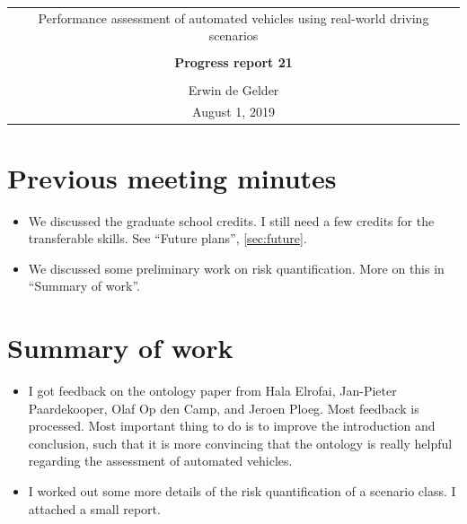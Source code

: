 \documentclass[10pt,final,a4paper,oneside,onecolumn]{article}
\newcommand{\progressreportnumber}{21}
\renewcommand{\author}{Erwin de Gelder}
\renewcommand{\date}{August 1, 2019}
\renewcommand{\title}{Performance assessment of automated vehicles using real-world driving scenarios}
\begin{document}
	
\begin{center}
	\begin{tabular}{c}
		\title \\ \\
		\textbf{\huge Progress report \progressreportnumber} \\ \\
		\author \\ 
		\date
	\end{tabular}
\end{center}

\section{Previous meeting minutes}

\begin{itemize}
	\item We discussed the graduate school credits. I still need a few credits for the transferable skills. See ``Future plans'', \cref{sec:future}.
	\item We discussed some preliminary work on risk quantification. More on this in ``Summary of work''.
\end{itemize}

\section{Summary of work}

\begin{itemize}
	\item I got feedback on the ontology paper from Hala Elrofai, Jan-Pieter Paardekooper, Olaf Op den Camp, and Jeroen Ploeg. Most feedback is processed. Most important thing to do is to improve the introduction and conclusion, such that it is more convincing that the ontology is really helpful regarding the assessment of automated vehicles.
	\item I worked out some more details of the risk quantification of a scenario class. I attached a small report.
\end{itemize}
\end{document}

